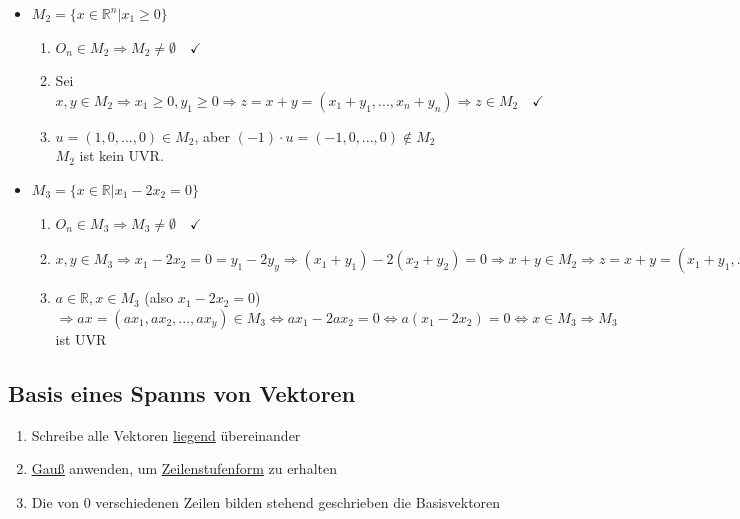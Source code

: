 \documentclass{scrartcl}
\newcommand{\linkTo}[1]{\hyperref[#1]{\underline{#1}}}
\newcommand{\linkToRef}[2][ref]{\hyperref[#1]{\underline{#2}}}
\begin{document}
\begin{Beispiel}
\begin{itemize}
\item %
		$M_2 = \{x \in \mathbb{R}^n | x_1 \geq 0\}$
		\begin{enumerate}[label={(\arabic*)}]
			\item %
			$O_n \in M_2 \Rightarrow M_2 \neq \emptyset \quad \checkmark$
			
			\item %
			Sei $x,y \in M_2 \Rightarrow x_1 \geq 0, y_1 \geq 0 \Rightarrow z = x + y = (x_1 + y_1, ..., x_n + y_n) \Rightarrow z \in M_2 \quad \checkmark$
			
			\item %
			$u = (1, 0, ..., 0) \in M_2$, aber $(-1) \cdot u = (-1, 0, ..., 0) \notin M_2$ \\
			$M_2$ ist kein UVR.
		\end{enumerate}
		
		\item %
		$M_3 = \{x \in \mathbb{R} | x_1 - 2x_2 = 0\}$
		\begin{enumerate}[label={(\arabic*)}]
			\item %
			$O_n \in M_3 \Rightarrow M_3 \neq \emptyset \quad \checkmark$
			
			\item %
			$x,y \in M_3 \Rightarrow x_1 - 2x_2 = 0 = y_1 - 2y_y \Rightarrow (x_1 + y_1) - 2(x_2 + y_2) = 0 \Rightarrow x + y \in M_2 \Rightarrow z = x + y = (x_1 + y_1, ..., x_1 + y_y) \in M_3 \Leftrightarrow x_1 + y_1 - 2(x_2 + y_2) = 0 \Leftrightarrow x_1 - 2x_2 + y_1 - 2y_2 = 0 \Leftrightarrow x,y \in M_3$
			
			\item %
			$a \in \mathbb{R}, x \in M_3$ (also $x_1 - 2x_2 = 0$) $\Rightarrow ax = (ax_1, ax_2, ..., ax_y) \in M_3 \Leftrightarrow ax_1 - 2ax_2 = 0 \Leftrightarrow a(x_1 - 2x_2) = 0 \Leftrightarrow x \in M_3 \Rightarrow M_3$ ist UVR
		\end{enumerate}
\end{itemize}
\end{Beispiel}

\subsection{Basis eines Spanns von Vektoren}

\begin{enumerate}
\item Schreibe alle Vektoren \underline{liegend} übereinander
\item \linkToRef[Gauss]{Gauß} anwenden, um \linkTo{Zeilenstufenform} zu erhalten
\item Die von 0 verschiedenen Zeilen bilden stehend geschrieben die Basisvektoren
\end{enumerate}
\end{document}

